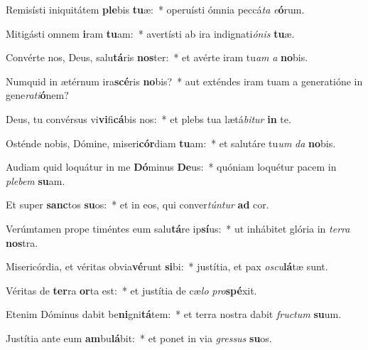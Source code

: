 \item Remisísti iniquitátem \textbf{ple}bis \textbf{tu}æ:~* operuísti ómnia peccá\textit{ta} \textit{e}\textbf{ó}rum.
\item Mitigásti omnem \textbf{i}ram \textbf{tu}am:~* avertísti ab ira indignati\textit{ó}\textit{nis} \textbf{tu}æ.
\item Convérte nos, Deus, salu\textbf{tá}ris \textbf{nos}ter:~* et avérte iram tu\textit{am} \textit{a} \textbf{no}bis.
\item Numquid in ætérnum ira\textbf{scé}ris \textbf{no}bis?~* aut exténdes iram tuam a generatióne in gene\textit{ra}\textit{ti}\textbf{ó}nem?
\item Deus, tu convérsus vi\textbf{vi}fi\textbf{cá}bis nos:~* et plebs tua lætá\textit{bi}\textit{tur} \textbf{in} te.
\item Osténde nobis, Dómine, miseri\textbf{cór}diam \textbf{tu}am:~* et salutáre tu\textit{um} \textit{da} \textbf{no}bis.
\item Audiam quid loquátur in me \textbf{Dó}minus \textbf{De}us:~* quóniam loquétur pacem in \textit{ple}\textit{bem} \textbf{su}am.
\item Et super \textbf{sanc}tos \textbf{su}os:~* et in eos, qui conver\textit{tún}\textit{tur} \textbf{ad} cor.
\item Verúmtamen prope timéntes eum salu\textbf{tá}re ip\textbf{sí}us:~* ut inhábitet glória in \textit{ter}\textit{ra} \textbf{nos}tra.
\item Misericórdia, et véritas obvia\textbf{vé}runt \textbf{si}bi:~* justítia, et pax \textit{os}\textit{cu}\textbf{lá}tæ sunt.
\item Véritas de \textbf{ter}ra \textbf{or}ta est:~* et justítia de cæ\textit{lo} \textit{pro}\textbf{spé}xit.
\item Etenim Dóminus dabit be\textbf{ni}gni\textbf{tá}tem:~* et terra nostra dabit \textit{fruc}\textit{tum} \textbf{su}um.
\item Justítia ante eum \textbf{am}bu\textbf{lá}bit:~* et ponet in via \textit{gres}\textit{sus} \textbf{su}os.

